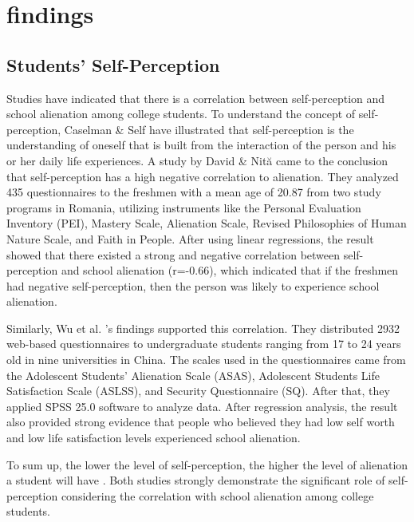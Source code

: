 \documentclass{scupi_apa_thesis}
\begin{document}
\section{findings}
\subsection{Students' Self-Perception }
\par
Studies have indicated that there is a correlation between self-perception and school alienation among college students. 
To understand the concept of self-perception, Caselman \& Self \citeyear{caselman2007adolescent} have illustrated that self-perception is the understanding of oneself that is built from the interaction of the person and his or her daily life experiences. 
A study by David \& Nită \citeyear{david2014adjustment} came to the conclusion that self-perception has a high negative correlation to alienation. 
They analyzed 435 questionnaires to the freshmen with a mean age of 20.87 from two study programs in Romania, utilizing instruments like the Personal Evaluation Inventory (PEI), 
Mastery Scale, Alienation Scale, Revised Philosophies of Human Nature Scale, and Faith in People. 
After using linear regressions, the result showed that there existed a strong and negative correlation between self-perception and school alienation (r=-0.66), which indicated that if the freshmen had negative self-perception, then the person was likely to experience school alienation. 
\par
Similarly, Wu et al. \citeyear{wu2024sense}'s findings supported this correlation. 
They distributed 2932 web-based questionnaires to undergraduate students ranging from 17 to 24 years old in nine universities in China. 
The scales used in the questionnaires came from the Adolescent Students' Alienation Scale (ASAS), Adolescent Students Life Satisfaction Scale (ASLSS), and Security Questionnaire (SQ). 
After that, they applied SPSS 25.0 software to analyze data. 
After regression analysis, the result also provided strong evidence that people who believed they had low self worth and low life satisfaction levels experienced school alienation. 
\par
To sum up, the lower the level of self-perception, the higher the level of alienation a student will have \cite{david2014adjustment}. 
Both studies strongly demonstrate the significant role of self-perception considering the correlation with school alienation among college students.
\end{document}
